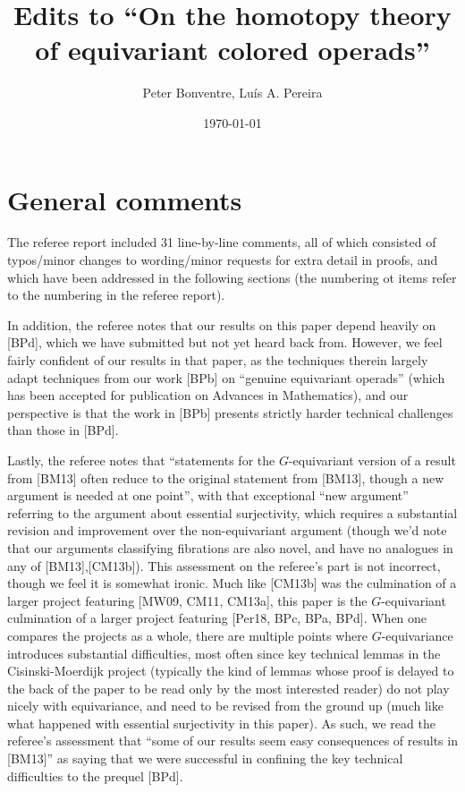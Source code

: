 \documentclass[a4paper,10pt
]{article}%
\title{Edits to ``On the homotopy theory of equivariant colored operads''}
\author{Peter Bonventre, Lu\'is A. Pereira}%
\date{\today}
\numberwithin{equation}{section}
\numberwithin{figure}{section}
\theoremstyle{definition} %
\newcommand{\1}{\ensuremath{\mathbbm 1}}%
\begin{document}
 
  
\maketitle
 



\section{General comments}

The referee report included 31 line-by-line comments, 
all of which consisted of typos/minor changes 
to wording/minor requests for extra detail in proofs, and which have been addressed in the following sections (the numbering ot items refer to the numbering in the referee report).

In addition, the referee notes that our results on this paper depend heavily on [BPd], 
which we have submitted but not yet heard back from.
However, we feel fairly confident of our results in that paper,
as the techniques therein largely adapt techniques from our work [BPb] on ``genuine equivariant operads'' (which has been accepted for publication on Advances in Mathematics),
and our perspective is that the work in [BPb] presents strictly harder technical challenges than those in [BPd].


Lastly, the referee notes that ``statements for the $G$-equivariant version of a result from [BM13] often reduce to the original statement from [BM13], though a new argument is needed at one point'',
with that exceptional ``new argument'' referring to the 
argument about essential surjectivity, 
which requires a substantial revision and improvement over the non-equivariant argument (though we'd note that our arguments classifying fibrations are also novel, and have no analogues in any of [BM13],[CM13b]).
This assessment on the referee's part is not incorrect, though we feel it is somewhat ironic.
Much like [CM13b] was the culmination of a larger project featuring [MW09, CM11, CM13a], 
this paper is the $G$-equivariant culmination of a larger project featuring [Per18, BPc, BPa, BPd].
When one compares the projects as a whole, 
there are multiple points where $G$-equivariance introduces 
substantial difficulties, most often since key technical lemmas in the Cisinski-Moerdijk project (typically the kind of lemmas whose proof is delayed to the back of the paper to be read only by the most interested reader) do not play nicely with equivariance, and need to be revised from the ground up 
(much like what happened with essential surjectivity in this paper).
As such, we read the referee's assessment that ``some of our results seem easy consequences of results in [BM13]''
as saying that we were successful in confining the key 
technical difficulties to the prequel [BPd].
\end{document}
